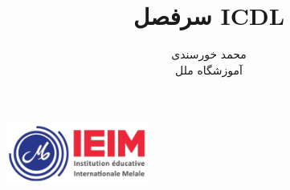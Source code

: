 \documentclass{article}
\title{سرفصل ICDL}
\author{محمد خورسندی\\ آموزشگاه ملل}
\date{}
\begin{document}
\begin{center}
\includegraphics[height=2cm]{logo.png}
\end{center}
\maketitle





\end{document}
